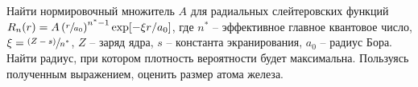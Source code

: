 \par
{} Найти нормировочный множитель $A$ для радиальных слейтеровских функций $R_n(r)=A\left( \sfrac{r}{a_0} \right) ^{n^*-1}\exp[-\xi r/ a_0]$, где $n^*$ – эффективное главное квантовое число, $\xi=\sfrac{(Z-s)}{n^*}$, $Z$ – заряд ядра, $s$ – константа экранирования, $a_0$ – радиус Бора. Найти радиус, при котором плотность вероятности будет максимальна. Пользуясь полученным выражением, оценить размер атома железа.
\par
